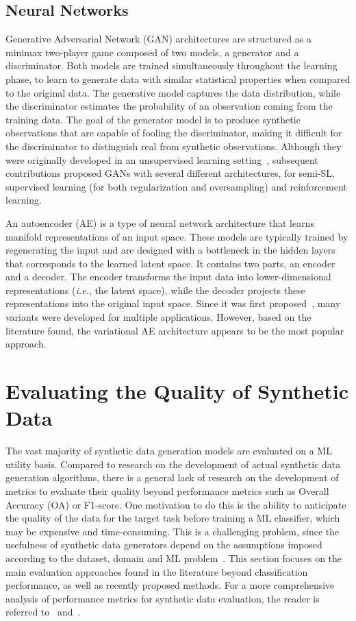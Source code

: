 \subsection{Neural Networks}

Generative Adversarial Network (GAN) architectures are structured as a minimax
two-player game composed of two models, a generator and a discriminator. Both
models are trained simultaneously throughout the learning phase, to learn to
generate data with similar statistical properties when compared to the
original data. The generative model captures the data distribution, while the
discriminator estimates the probability of an observation coming from the
training data. The goal of the generator model is to produce synthetic
observations that are capable of fooling the discriminator, making it
difficult for the discriminator to distinguish real from synthetic
observations. Although they were originally developed in an unsupervised
learning setting~\cite{goodfellow2020generative}, subsequent contributions
proposed GANs with several different architectures, for semi-SL, supervised
learning (for both regularization and oversampling) and reinforcement
learning.

An autoencoder (AE) is a type of neural network architecture that learns
manifold representations of an input space. These models are typically trained
by regenerating the input and are designed with a bottleneck in the hidden
layers that corresponds to the learned latent space. It contains two parts,
an encoder and a decoder. The encoder transforms the input data into
lower-dimensional representations (\textit{i.e.}, the latent space), while
the decoder projects these representations into the original input space.
Since it was first proposed~\cite{ackley1985learning}, many variants were
developed for multiple applications. However, based on the literature found,
the variational AE architecture appears to be the most popular approach.

\section{Evaluating the Quality of Synthetic Data
}\label{sec:evaluating-synthetic-data-synth}

The vast majority of synthetic data generation models are evaluated on a ML
utility basis. Compared to research on the development of actual synthetic
data generation algorithms, there is a general lack of research on the
development of metrics to evaluate their quality beyond performance metrics
such as Overall Accuracy (OA) or F1-score. One motivation to do this is the
ability to anticipate the quality of the data for the target task before
training a ML classifier, which may be expensive and time-consuming.  This is
a challenging problem, since the usefulness of synthetic data generators
depend on the assumptions imposed according to the dataset, domain and ML
problem~\cite{chundawat2022tabsyndex}. This section focuses on the main
evaluation approaches found in the literature beyond classification
performance, as well as recently proposed methods. For a more comprehensive
analysis of performance metrics for synthetic data evaluation, the reader is
referred to~\cite{dankar2022multi} and~\cite{theis2016note}.


